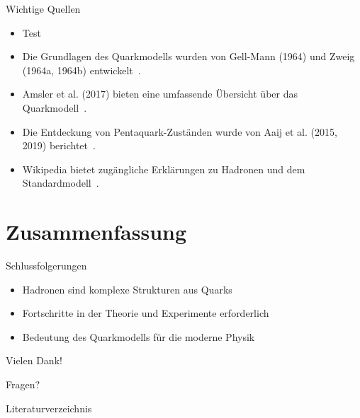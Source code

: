 \documentclass[aspectratio=169]{beamer} %
\begin{document}
    \begin{frame}{Wichtige Quellen}
        \begin{itemize}
          \item Test
            \item Die Grundlagen des Quarkmodells wurden von Gell-Mann (1964) und Zweig (1964a, 1964b) entwickelt~\cite{GellMann.1964, Zweig.1964, Zweig.1964b}.
            \item Amsler et al. (2017) bieten eine umfassende Übersicht über das Quarkmodell~\cite{C.Amsler.2017}.
            \item Die Entdeckung von Pentaquark-Zuständen wurde von Aaij et al. (2015, 2019) berichtet~\cite{Aaij.2019}.
            \item Wikipedia bietet zugängliche Erklärungen zu Hadronen und dem Standardmodell~\cite{Wikipedia.Hadron, Wikipedia.Standardmodell}.
        \end{itemize}
    \end{frame}
    
    \section{Zusammenfassung}
    \begin{frame}{Schlussfolgerungen}
        \begin{itemize}
            \item Hadronen sind komplexe Strukturen aus Quarks
            \item Fortschritte in der Theorie und Experimente erforderlich
            \item Bedeutung des Quarkmodells für die moderne Physik
        \end{itemize}
    \end{frame}
    
    \begin{frame}{Vielen Dank!}
        \begin{center}
            \Huge Fragen?
        \end{center}
    \end{frame}

    \begin{frame}[allowframebreaks]{Literaturverzeichnis}
    \printbibliography[nottype=unpublished]
    \end{frame}
\end{document}
